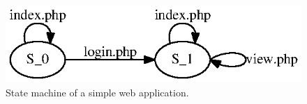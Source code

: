 \begin{figure}[tb]
  \centering
  \includegraphics{figures/simple_state_graph.ps}
  \caption{State machine of a simple web application.}
\end{figure}

